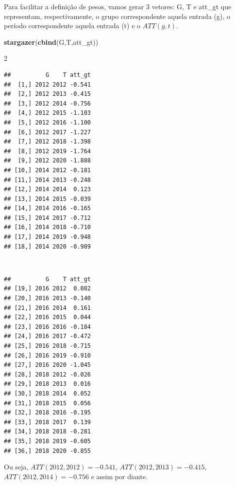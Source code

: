 \documentclass[portugues]{article}
\newenvironment{Shaded}{\begin{snugshade}}{\end{snugshade}}
\newcommand{\CommentTok}[1]{\textcolor[rgb]{0.56,0.35,0.01}{\textit{#1}}}
\newcommand{\DecValTok}[1]{\textcolor[rgb]{0.00,0.00,0.81}{#1}}
\newcommand{\FunctionTok}[1]{\textcolor[rgb]{0.13,0.29,0.53}{\textbf{#1}}}
\newcommand{\NormalTok}[1]{#1}
\newcommand{\OtherTok}[1]{\textcolor[rgb]{0.56,0.35,0.01}{#1}}
\newcommand{\SpecialCharTok}[1]{\textcolor[rgb]{0.81,0.36,0.00}{\textbf{#1}}}
\begin{document}
\begin{box_code}
\begin{verbatim}
\end{verbatim}

Para facilitar a definição de pesos, vamos gerar 3 vetores: G, T e att\_gt que representam, respectivamente, o grupo correspondente aquela entrada (g), o período correspondente aquela entrada (t) e o $ATT(g,t)$. 

\begin{Shaded}
\end{Shaded}

\begin{Shaded}
\begin{Highlighting}[]
\FunctionTok{stargazer}\NormalTok{(}\FunctionTok{cbind}\NormalTok{(G,T,att\_gt))}
\end{Highlighting}
\end{Shaded}

\begin{multicols}{2}
\centering
\begin{verbatim}
##          G    T att_gt
##  [1,] 2012 2012 -0.541
##  [2,] 2012 2013 -0.415
##  [3,] 2012 2014 -0.756
##  [4,] 2012 2015 -1.103
##  [5,] 2012 2016 -1.100
##  [6,] 2012 2017 -1.227
##  [7,] 2012 2018 -1.398
##  [8,] 2012 2019 -1.764
##  [9,] 2012 2020 -1.888
## [10,] 2014 2012 -0.181
## [11,] 2014 2013 -0.248
## [12,] 2014 2014  0.123
## [13,] 2014 2015 -0.039
## [14,] 2014 2016 -0.165
## [15,] 2014 2017 -0.712
## [16,] 2014 2018 -0.710
## [17,] 2014 2019 -0.948
## [18,] 2014 2020 -0.989
\end{verbatim}
\\
\begin{verbatim}
##          G    T att_gt
## [19,] 2016 2012  0.082
## [20,] 2016 2013 -0.140
## [21,] 2016 2014  0.161
## [22,] 2016 2015  0.044
## [23,] 2016 2016 -0.184
## [24,] 2016 2017 -0.472
## [25,] 2016 2018 -0.715
## [26,] 2016 2019 -0.910
## [27,] 2016 2020 -1.045
## [28,] 2018 2012 -0.026
## [29,] 2018 2013  0.016
## [30,] 2018 2014  0.052
## [31,] 2018 2015  0.056
## [32,] 2018 2016 -0.195
## [33,] 2018 2017  0.139
## [34,] 2018 2018 -0.281
## [35,] 2018 2019 -0.605
## [36,] 2018 2020 -0.855
\end{verbatim}

\end{multicols}

Ou seja, $ATT(2012, 2012) = -0.541$, $ATT(2012, 2013) = -0.415$, $ATT(2012, 2014) = -0.756$ e assim por diante.

\end{box_code}
\end{document}
